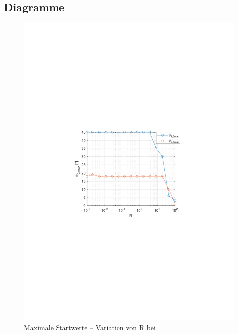 \subsection{Diagramme}

\begin{figure}[htb]
	\centering
		\includegraphics[width=1\textwidth]{Bilder/QRVariation/ap2/R phi12.pdf}
	\caption{Maximale Startwerte -- Variation von R bei \apz}
	\label{fig:qrap2R}
\end{figure}

